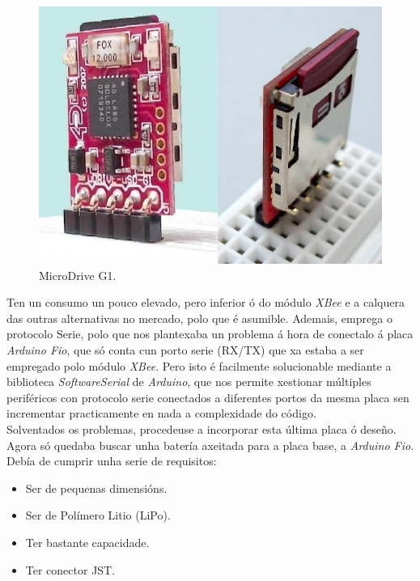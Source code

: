  \begin{figure}[htbp]
   \centering
   \includegraphics[scale=0.3,keepaspectratio=true]{./imagenes/microdrive-g1.jpg}
   \caption{MicroDrive G1.}
   \label{figura:MicroDriveG1}
  \end{figure}

  Ten un consumo un pouco elevado, pero inferior ó do módulo \textit{XBee} e a
  calquera das outras alternativas no mercado, polo que é asumible. Ademais,
  emprega o protocolo Serie, polo que nos plantexaba un problema á hora de
  conectalo á placa \textit{Arduino Fio}, que só conta cun porto serie (RX/TX)
  que xa estaba a ser empregado polo módulo \textit{XBee}. Pero isto é
  facilmente solucionable mediante a biblioteca \textit{SoftwareSerial} de
  \textit{Arduino}, que nos permite xestionar múltiples periféricos con
  protocolo serie conectados a diferentes portos da mesma placa sen incrementar
  practicamente en nada a complexidade do código. \\

  Solventados os problemas, procedeuse a incorporar esta última placa ó deseño.
  Agora só quedaba buscar unha batería axeitada para a placa base, a
  \textit{Arduino Fio}. Debía de cumprir unha serie de requisitos:

  \begin{itemize}
   \item Ser de pequenas dimensións.
   \item Ser de Polímero Litio (LiPo).
   \item Ter bastante capacidade.
   \item Ter conector JST.
  \end{itemize}

